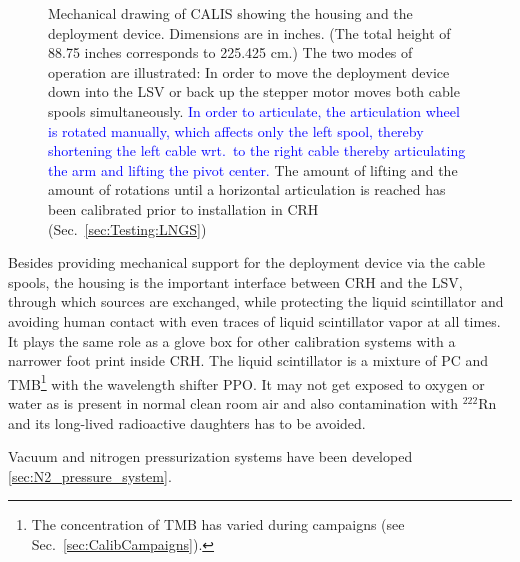 \begin{figure}[htbp]
 \caption{Mechanical drawing of CALIS showing the housing and the deployment device. Dimensions are in inches. (The total height of 88.75 inches corresponds to 225.425 cm.) The two modes of operation are illustrated: In order to move the deployment device down into the LSV or back up the stepper motor moves both cable spools simultaneously. \textcolor{blue}{In order to articulate, the articulation wheel is rotated manually, which affects only the left spool, thereby shortening the left cable wrt.~to the right cable thereby articulating the arm and lifting the pivot center.} The amount of lifting and the amount of rotations until a horizontal articulation is reached has been calibrated prior to installation in CRH (Sec.~\ref{sec:Testing:LNGS})\label{fig:CALISDimensions}\label{fig:CALISMechanism}\label{fig:gearDrawing}
}
\end{figure}

Besides providing mechanical support for the deployment device via the cable spools, the housing is the important interface between CRH and the LSV, through which sources are exchanged, while protecting the liquid scintillator and avoiding human contact with even traces of liquid scintillator vapor at all times. It plays the same role as a glove box for other calibration systems with a narrower foot print inside CRH. The liquid scintillator is a mixture of PC and TMB\footnote{The concentration of TMB has varied during campaigns (see Sec.~\ref{sec:CalibCampaigns}).} with the wavelength shifter PPO\cite{vetoPaper}. It may not get exposed to oxygen or water as is present in normal clean room air and also contamination with $^{222}$Rn and its long-lived radioactive daughters has to be avoided. 



Vacuum and nitrogen pressurization systems have been developed \ref{sec:N2_pressure_system}.



